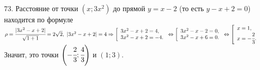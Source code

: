 73. Расстояние от точки $(x;3x^2)$ до прямой $y=x-2$ (то есть $y-x+2=0$) находится по формуле $\rho=\cfrac{|3x^2-x+2|}{\sqrt{1+1}}=2\sqrt{2},\
|3x^2-x+2|=4\Rightarrow \left[\begin{array}{l}3x^2-x+2=4,\\ 3x^2-x+2=-4.\end{array}\right.\Leftrightarrow \left[\begin{array}{l}3x^2-x-2=0,\\ 3x^2-x+6=0.\end{array}\right.\Leftrightarrow\left[\begin{array}{l}x=1,\\ x=-\cfrac{2}{3}.\end{array}\right.$ Значит, это точки
$\left(-\cfrac{2}{3};\cfrac{4}{3}\right)$ и $(1;3).$\\
